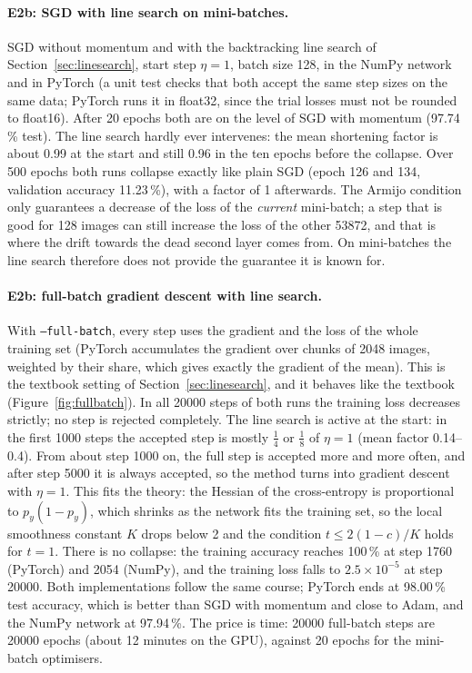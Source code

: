 \documentclass[11pt,a4paper]{article}
\newcommand{\1}{\mathbf{1}}
\begin{document}
\paragraph{E2b: SGD with line search on mini-batches.} SGD without momentum and with the
backtracking line search of Section~\ref{sec:linesearch}, start step $\eta = 1$, batch size 128,
in the NumPy network and in PyTorch (a unit test checks that both accept the same step sizes on
the same data; PyTorch runs it in float32, since the trial losses must not be rounded to
float16). After 20 epochs both are on the level of SGD with momentum (97.74\,\% test). The
line search hardly ever intervenes: the mean shortening factor is about 0.99 at the start and
still 0.96 in the ten epochs before the collapse. Over 500 epochs both runs collapse exactly like
plain SGD (epoch 126 and 134, validation accuracy 11.23\,\%), with a factor of 1 afterwards. The
Armijo condition only guarantees a decrease of the loss of the \emph{current} mini-batch; a step
that is good for 128 images can still increase the loss of the other \num{53872}, and that is
where the drift towards the dead second layer comes from. On mini-batches the line search
therefore does not provide the guarantee it is known for.

\paragraph{E2b: full-batch gradient descent with line search.} With \texttt{--full-batch}, every
step uses the gradient and the loss of the whole training set (PyTorch accumulates the gradient
over chunks of \num{2048} images, weighted by their share, which gives exactly the gradient of
the mean). This is the textbook setting of Section~\ref{sec:linesearch}, and it behaves like
the textbook (Figure~\ref{fig:fullbatch}). In all \num{20000} steps of both runs the training
loss decreases strictly; no step is rejected completely. The line search is active at the start:
in the first \num{1000} steps the accepted step is mostly $\tfrac14$ or $\tfrac18$ of $\eta = 1$
(mean factor 0.14--0.4). From about step \num{1000} on, the full step is accepted more and more
often, and after step \num{5000} it is always accepted, so the method turns into gradient descent
with $\eta = 1$. This fits the theory: the Hessian of the cross-entropy is proportional to
$p_y (1 - p_y)$, which shrinks as the network fits the training set, so the local smoothness
constant $K$ drops below 2 and the condition $t \le 2(1-c)/K$ holds for $t = 1$. There is no
collapse: the training accuracy reaches 100\,\% at step \num{1760} (PyTorch) and \num{2054}
(NumPy), and the training loss
falls to $2.5 \times 10^{-5}$ at step \num{20000}. Both implementations follow the same course;
PyTorch ends at 98.00\,\% test accuracy, which is better than SGD with momentum and close to
Adam, and the NumPy network at 97.94\,\%. The price is time: \num{20000} full-batch steps are
\num{20000} epochs (about 12 minutes on the GPU), against 20 epochs for the mini-batch
optimisers.
\end{document}
